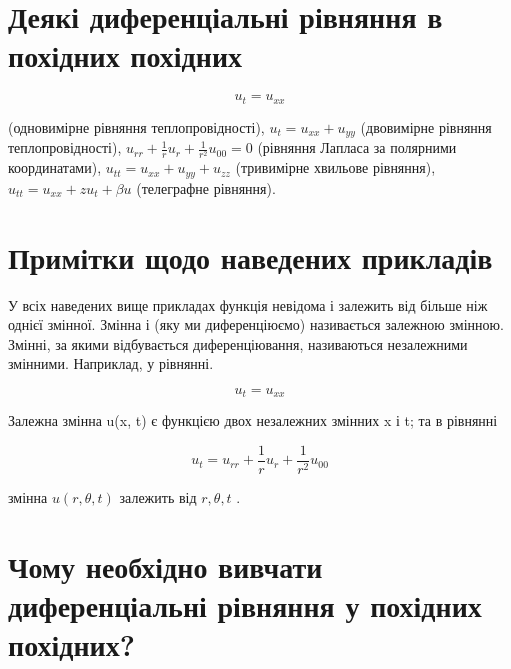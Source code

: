 \documentclass[
  ukrainian,
]{article}
\begin{document}
\section{Деякі диференціальні рівняння в похідних
похідних}\label{ux434ux435ux44fux43aux456-ux434ux438ux444ux435ux440ux435ux43dux446ux456ux430ux43bux44cux43dux456-ux440ux456ux432ux43dux44fux43dux43dux44f-ux432-ux43fux43eux445ux456ux434ux43dux438ux445-ux43fux43eux445ux456ux434ux43dux438ux445}

\[
u_t = u_{xx}
\]

(одновимірне рівняння теплопровідності), \(u_t = u_{xx} + u_{yy}\)
(двовимірне рівняння теплопровідності),
\(u_{rr} + \frac{1}{r}u_r + \frac{1}{r^2}u_{00} = 0\) (рівняння Лапласа
за полярними координатами), \(u_{tt} = u_{xx} + u_{yy} + u_{zz}\)
(тривимірне хвильове рівняння), \(u_{tt} = u_{xx} + zu_t + \beta u\)
(телеграфне рівняння).

\section{Примітки щодо наведених
прикладів}\label{ux43fux440ux438ux43cux456ux442ux43aux438-ux449ux43eux434ux43e-ux43dux430ux432ux435ux434ux435ux43dux438ux445-ux43fux440ux438ux43aux43bux430ux434ux456ux432}

У всіх наведених вище прикладах функція невідома і залежить від більше
ніж однієї змінної. Змінна і (яку ми диференціюємо) називається залежною
змінною. Змінні, за якими відбувається диференціювання, називаються
незалежними змінними. Наприклад, у рівнянні.

\[
u_t = u_{xx}
\]

Залежна змінна u(x, t) є функцією двох незалежних змінних x і t; та в
рівнянні

\[
u_t = u_{rr} + \frac{1}{r} u_r + \frac{1}{r^2} u_{00}
\]

змінна \(u(r, \theta, t)\) залежить від \(r, \theta, t\) .

\section{Чому необхідно вивчати диференціальні рівняння у похідних
похідних?}\label{ux447ux43eux43cux443-ux43dux435ux43eux431ux445ux456ux434ux43dux43e-ux432ux438ux432ux447ux430ux442ux438-ux434ux438ux444ux435ux440ux435ux43dux446ux456ux430ux43bux44cux43dux456-ux440ux456ux432ux43dux44fux43dux43dux44f-ux443-ux43fux43eux445ux456ux434ux43dux438ux445-ux43fux43eux445ux456ux434ux43dux438ux445}
\end{document}
